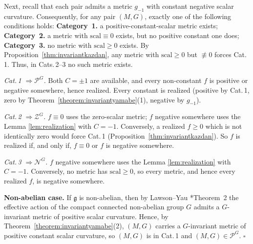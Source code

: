 \documentclass[12pt,a4paper]{amsart}
\theoremstyle{plain}
\theoremstyle{definition}
\theoremstyle{remark}
\newcommand{\ga}{\mathit{g}} %
\begin{document}
Next, recall that each pair admits a metric $\ga_{-1}$ with constant negative scalar curvature. Consequently, for any pair $(M,G)$, exactly one of the following conditions holds:
\textbf{Category \,1.} a positive-constant-scalar metric exists; \textbf{Category \,2.} a metric with
$\mathrm{scal}\equiv0$ exists, but no positive constant one does; \textbf{Category \,3.} no metric with $\mathrm{scal}\ge0$ exists.
By Proposition~\ref{thm:invariantkazdan}, any metric with $\mathrm{scal}\ge0$ but $\not\equiv0$ forces
Cat.\,1. Thus, in Cats.\,2--3 no such metric exists.


\emph{Cat.\,1 $\Rightarrow\mathscr P^G$.} Both $C=\pm1$ are available, and every non-constant $f$ is
positive or negative somewhere, hence realized. Every constant is realized (positive by Cat.\,1,
zero by Theorem~\ref{theorem:invariantyamabe}(1), negative by $\ga_{-1}$).

\emph{Cat.\,2 $\Rightarrow\mathscr Z^G$.} $f\equiv0$ uses the zero-scalar metric; $f$ negative
somewhere uses the Lemma \ref{lem:realization} with $C=-1$. Conversely, a realized $f\ge0$ which is not identically zero 
would force Cat.\,1 (Proposition~\ref{thm:invariantkazdan}). So $f$ is realized if, and only if, $f\equiv0$ or
$f$ is negative somewhere.

\emph{Cat.\,3 $\Rightarrow\mathscr N^G$.} $f$ negative somewhere uses the Lemma \ref{lem:realization} with
$C=-1$. Conversely, no metric has $\mathrm{scal}\ge0$, so every metric, and hence every realized $f$, is
negative somewhere.

\medskip
\textbf{Non-abelian case.} If $\mathfrak g$ is non-abelian, then by Lawson--Yau
\cite{lawson-yau}*{Theorem~2} the effective action of the compact connected non-abelian group
$G$ admits a $G$-invariant metric of positive scalar curvature. Hence, by
Theorem~\ref{theorem:invariantyamabe}(2), $(M,G)$ carries a $G$-invariant metric of positive
constant scalar curvature, so $(M,G)$ is in Cat.\,1 and $(M,G)\in\mathscr P^G$. \hfill$\square$


\bigskip
\end{document}
